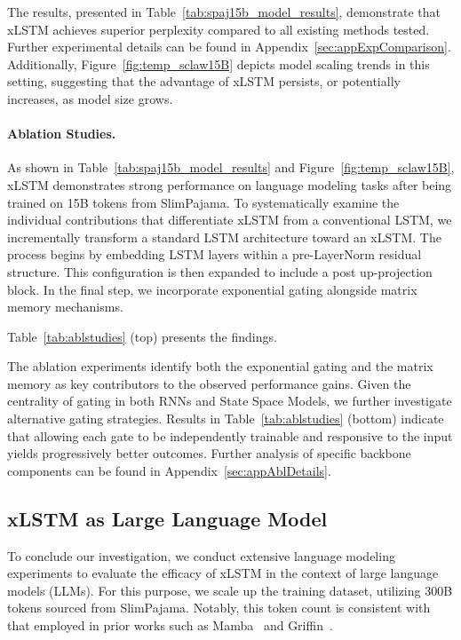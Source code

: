 The results, presented in Table~\ref{tab:spaj15b_model_results}, demonstrate that xLSTM achieves superior perplexity compared to all existing methods tested. Further experimental details can be found in Appendix~\ref{sec:appExpComparison}. Additionally, Figure~\ref{fig:temp_sclaw15B} depicts model scaling trends in this setting, suggesting that the advantage of xLSTM persists, or potentially increases, as model size grows.

\paragraph{Ablation Studies.}
As shown in Table~\ref{tab:spaj15b_model_results} and Figure~\ref{fig:temp_sclaw15B}, xLSTM demonstrates strong performance on language modeling tasks after being trained on 15B tokens from SlimPajama. To systematically examine the individual contributions that differentiate xLSTM from a conventional LSTM, we incrementally transform a standard LSTM architecture toward an xLSTM. The process begins by embedding LSTM layers within a pre-LayerNorm residual structure. This configuration is then expanded to include a post up-projection block. In the final step, we incorporate exponential gating alongside matrix memory mechanisms.

Table~\ref{tab:ablstudies} (top) presents the findings.

The ablation experiments identify both the exponential gating and the matrix memory as key contributors to the observed performance gains. Given the centrality of gating in both RNNs and State Space Models, we further investigate alternative gating strategies. Results in Table~\ref{tab:ablstudies} (bottom) indicate that allowing each gate to be independently trainable and responsive to the input yields progressively better outcomes. Further analysis of specific backbone components can be found in Appendix~\ref{sec:appAblDetails}.

\subsection{xLSTM as Large Language Model}
\label{sec:ExpLanguage}

To conclude our investigation, we conduct extensive language modeling experiments to evaluate the efficacy of xLSTM in the context of large language models (LLMs). For this purpose, we scale up the training dataset, utilizing 300B tokens sourced from SlimPajama. Notably, this token count is consistent with that employed in prior works such as Mamba~\citep{Gu:24arxiv} and Griffin~\citep{De:24arxiv}.

